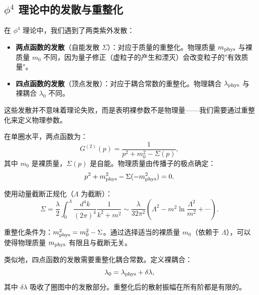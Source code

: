 
\subsection{$\phi^4$ 理论中的发散与重整化}

\begin{note}[发散的物理意义]
在 $\phi^4$ 理论中，我们遇到了两类紫外发散：
\begin{itemize}
    \item \textbf{两点函数的发散}（自能发散 $\Sigma$）：对应于质量的重整化。物理质量 $m_{\rm phys}$ 与裸质量 $m_0$ 不同，因为量子修正（虚粒子的产生和湮灭）会改变粒子的"有效质量"。
    \item \textbf{四点函数的发散}（顶点发散）：对应于耦合常数的重整化。物理耦合 $\lambda_{\rm phys}$ 与裸耦合 $\lambda_0$ 不同。
\end{itemize}
这些发散并不意味着理论失败，而是表明裸参数不是物理量——我们需要通过重整化来定义物理参数。
\end{note}

\begin{example}[质量重整化的具体计算]
在单圈水平，两点函数为：
\begin{equation}
    G^{(2)}(p) = \frac{1}{p^2 + m_0^2 - \Sigma(p)},
\end{equation}
其中 $m_0$ 是裸质量，$\Sigma(p)$ 是自能。物理质量由传播子的极点确定：
\begin{equation}
    p^2 + m_{\rm phys}^2 - \Sigma(-m_{\rm phys}^2) = 0.
\end{equation}

使用动量截断正规化（$\Lambda$ 为截断）：
\begin{equation}
    \Sigma = \frac{\lambda}{2} \int_0^\Lambda \frac{d^4 k}{(2\pi)^4} \frac{1}{k^2 + m^2} \sim \frac{\lambda}{32\pi^2}\left(\Lambda^2 - m^2 \ln\frac{\Lambda^2}{m^2} + \cdots\right).
\end{equation}

重整化条件为：$m_{\rm phys}^2 = m_0^2 - \Sigma$。通过选择适当的裸质量 $m_0$（依赖于 $\Lambda$），可以使得物理质量 $m_{\rm phys}$ 有限且与截断无关。
\end{example}

\begin{property}[耦合常数的重整化]
类似地，四点函数的发散需要重整化耦合常数。定义裸耦合：
\begin{equation}
    \lambda_0 = \lambda_{\rm phys} + \delta\lambda,
\end{equation}
其中 $\delta\lambda$ 吸收了圈图中的发散部分。重整化后的散射振幅在所有阶都是有限的。
\end{property}

